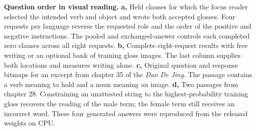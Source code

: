 \textbf{Question order in visual reading.}
\textbf{a,} Held clauses for which the focus reader selected the intended verb and object and wrote both accepted glosses. Four requests per language reverse the requested role and the order of the positive and negative instructions. The pooled and exchanged-answer controls each completed zero clauses across all eight requests. \textbf{b,} Complete eight-request results with free writing or an optional bank of training gloss images. The last column supplies both locations and measures writing alone. \textbf{c,} Original question and response bitmaps for an excerpt from chapter 35 of the \textit{Dao De Jing}. The passage contains a verb meaning to hold and a noun meaning an image. \textbf{d,} Two passages from chapter 28. Constraining an unattested string to the highest-probability training gloss recovers the reading of the male term; the female term still receives an incorrect word. These four generated answers were reproduced from the released weights on CPU.

